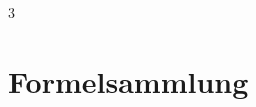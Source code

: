 \documentclass[paper=a4, landscape, fontsize=9pt]{scrartcl}
\begin{document}
\begin{multicols}{3}
	\section*{Formelsammlung}
\end{multicols}
\end{document}
